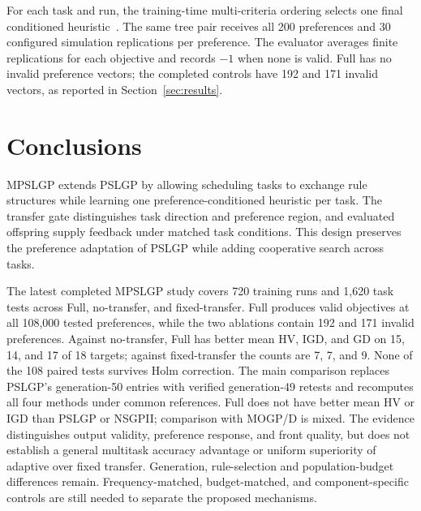 \documentclass[10pt,journal]{IEEEtran}
\newcommand{\resultrevision}[1]{\textcolor{resultrevision}{#1}}
\begin{document}
\resultrevision{For each task and run, the training-time multi-criteria ordering selects one final conditioned heuristic~\cite{xu2026pslgp}. The same tree pair receives all 200 preferences and 30 configured simulation replications per preference. The evaluator averages finite replications for each objective and records $-1$ when none is valid. Full has no invalid preference vectors; the completed controls have 192 and 171 invalid vectors, as reported in Section~\ref{sec:results}.}


\FloatBarrier

\FloatBarrier

\section{Conclusions}
\label{sec:conclusions}
\resultrevision{MPSLGP extends PSLGP by allowing scheduling tasks to exchange rule structures while learning one preference-conditioned heuristic per task. The transfer gate distinguishes task direction and preference region, and evaluated offspring supply feedback under matched task conditions. This design preserves the preference adaptation of PSLGP while adding cooperative search across tasks.}

\resultrevision{The latest completed MPSLGP study covers 720 training runs and 1,620 task tests across Full, no-transfer, and fixed-transfer. Full produces valid objectives at all 108,000 tested preferences, while the two ablations contain 192 and 171 invalid preferences. Against no-transfer, Full has better mean HV, IGD, and GD on 15, 14, and 17 of 18 targets; against fixed-transfer the counts are 7, 7, and 9. None of the 108 paired tests survives Holm correction. The main comparison replaces PSLGP's generation-50 entries with verified generation-49 retests and recomputes all four methods under common references. Full does not have better mean HV or IGD than PSLGP or NSGPII; comparison with MOGP/D is mixed. The evidence distinguishes output validity, preference response, and front quality, but does not establish a general multitask accuracy advantage or uniform superiority of adaptive over fixed transfer. Generation, rule-selection and population-budget differences remain. Frequency-matched, budget-matched, and component-specific controls are still needed to separate the proposed mechanisms.}



\end{document}
